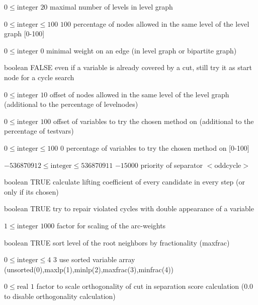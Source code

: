 %
{$0\leq\textrm{integer}$}%
{$20$}%
{maximal number of levels in level graph}%
{}

%
{$0\leq\textrm{integer}\leq100$}%
{$100$}%
{percentage of nodes allowed in the same level of the level graph [0-100]}%
{}

%
{$0\leq\textrm{integer}$}%
{$0$}%
{minimal weight on an edge (in level graph or bipartite graph)}%
{}

%
{boolean}%
{FALSE}%
{even if a variable is already covered by a cut, still try it as start node for a cycle search}%
{}

%
{$0\leq\textrm{integer}$}%
{$10$}%
{offset of nodes allowed in the same level of the level graph (additional to the percentage of levelnodes)}%
{}

%
{$0\leq\textrm{integer}$}%
{$100$}%
{offset of variables to try the chosen method on (additional to the percentage of testvars)}%
{}

%
{$0\leq\textrm{integer}\leq100$}%
{$0$}%
{percentage of variables to try the chosen method on [0-100]}%
{}

%
{$-536870912\leq\textrm{integer}\leq536870911$}%
{$-15000$}%
{priority of separator $<$oddcycle$>$}%
{}

%
{boolean}%
{TRUE}%
{calculate lifting coefficient of every candidate in every step (or only if its chosen)}%
{}

%
{boolean}%
{TRUE}%
{try to repair violated cycles with double appearance of a variable}%
{}

%
{$1\leq\textrm{integer}$}%
{$1000$}%
{factor for scaling of the arc-weights}%
{}

%
{boolean}%
{TRUE}%
{sort level of the root neighbors by fractionality (maxfrac)}%
{}

%
{$0\leq\textrm{integer}\leq4$}%
{$3$}%
{use sorted variable array (unsorted(0),maxlp(1),minlp(2),maxfrac(3),minfrac(4))}%
{}

%
{$0\leq\textrm{real}$}%
{$1$}%
{factor to scale orthogonality of cut in separation score calculation (0.0 to disable orthogonality calculation)}%
{}

